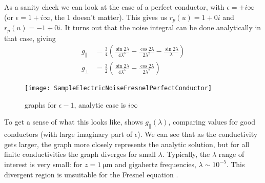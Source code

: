 \documentclass[11pt]{article}
\begin{document}
	As a sanity check we can look at the case of a perfect conductor, with $\epsilon = + i \infty$ (or $\epsilon = 1 + i \infty$, the $1$ doesn't matter).
	This gives us $r_p(u) = 1 + 0 i$ and $r_p(u) = -1 + 0 i$.
	It turns out that the noise integral can be done analytically in that case, giving
	\begin{align}
		g_{\parallel} &= \frac{3}{4} \left(\frac{\sin{2 \lambda}}{4 \lambda^3} - \frac{\cos{2 \lambda}}{2 \lambda^2} - \frac{\sin{2 \lambda}}{\lambda}\right) \\
		g_{\perp} &= \frac32 \left( \frac{\sin{2 \lambda}}{4 \lambda^3} - \frac{\cos{2 \lambda}}{2 \lambda^2} \right)
	\end{align}

	\begin{figure}[htp]
		\centering
		\texttt{[image: SampleElectricNoiseFresnelPerfectConductor]}
		\caption{graphs for $\epsilon - 1$, analytic case is $i \infty$} \label{fig:SampleElectricNoiseFresnelPerfect}
	\end{figure}

	To get a sense of what this looks like,  shows $g_{\parallel}(\lambda)$, comparing values for good conductors (with large imaginary part of $\epsilon$).
	We can see that as the conductivity gets larger, the graph more closely represents the analytic solution, but for all finite conductivities the graph diverges for small $\lambda$.
	Typically, the $\lambda$ range of interest is very small: for $z = \SI{1}{\micro\meter}$ and gigahertz frequencies, $\lambda \sim 10^{-5}$.
	This divergent region is unsuitable for the Fresnel equation .

	\newpage
	\listoftodos
	\newpage
	\printbibliography
\end{document}

